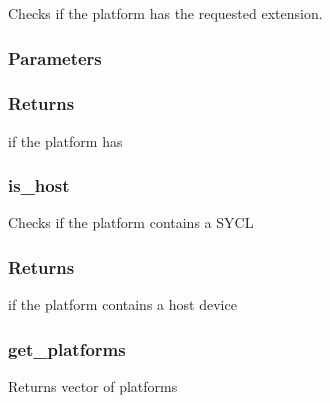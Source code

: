 \documentclass[letterpaper,10pt,english]{sphinxmanual}
\begin{document}
Checks if the platform has the requested extension.
\subsubsection*{Parameters}

\begin{DUlineblock}{0em}
\item[]  \sphinxhyphen{}
\end{DUlineblock}
\subsubsection*{Returns}

 if the platform has 


\subsubsection{is\_host}
\label{\detokenize{programming-interface/runtime/platform:is-host}}
\begin{sphinxVerbatim}[commandchars=\\\{\}]
  
\end{sphinxVerbatim}

Checks if the platform contains a SYCL {\hyperref[\detokenize{glossary:term-host-device}]{}}
\subsubsection*{Returns}

 if the platform contains a host device


\subsubsection{get\_platforms}
\label{\detokenize{programming-interface/runtime/platform:get-platforms}}
\begin{sphinxVerbatim}[commandchars=\\\{\}]
  
\end{sphinxVerbatim}

Returns vector of platforms
\end{document}
